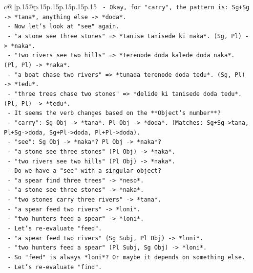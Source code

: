 \documentclass{article}
\begin{document}
{\begin{supertabular}{c@{$\;$}|p{.15\linewidth}@{}p{.15\linewidth}p{.15\linewidth}p{.15\linewidth}p{.15\linewidth}p{.15\linewidth}}
{{{\texttt{       {-} Okay, for "carry", the pattern is: Sg+Sg {-}> *tana*, anything else {-}> *doda*.} \\
\texttt{       {-} Now let's look at "see" again.} \\
\texttt{       {-} "a stone see three stones" => *tanise tanisede ki naka*. (Sg, Pl) {-}> *naka*.} \\
\texttt{       {-} "two rivers see two hills" => *terenode doda kalede doda naka*. (Pl, Pl) {-}> *naka*.} \\
\texttt{       {-} "a boat chase two rivers" => *tunada terenode doda tedu*. (Sg, Pl) {-}> *tedu*.} \\
\texttt{       {-} "three trees chase two stones" => *delide ki tanisede doda tedu*. (Pl, Pl) {-}> *tedu*.} \\
\texttt{       {-} It seems the verb changes based on the **Object's number**?} \\
\texttt{         {-} "carry": Sg Obj {-}> *tana*. Pl Obj {-}> *doda*. (Matches: Sg+Sg{-}>tana, Pl+Sg{-}>doda, Sg+Pl{-}>doda, Pl+Pl{-}>doda).} \\
\texttt{         {-} "see": Sg Obj {-}> *naka*? Pl Obj {-}> *naka*?} \\
\texttt{           {-} "a stone see three stones" (Pl Obj) {-}> *naka*.} \\
\texttt{           {-} "two rivers see two hills" (Pl Obj) {-}> *naka*.} \\
\texttt{           {-} Do we have a "see" with a singular object?} \\
\texttt{           {-} "a spear find three trees" {-}> *neso*.} \\
\texttt{           {-} "a stone see three stones" {-}> *naka*.} \\
\texttt{           {-} "two stones carry three rivers" {-}> *tana*.} \\
\texttt{           {-} "a spear feed two rivers" {-}> *loni*.} \\
\texttt{           {-} "two hunters feed a spear" {-}> *loni*.} \\
\texttt{       {-} Let's re{-}evaluate "feed".} \\
\texttt{         {-} "a spear feed two rivers" (Sg Subj, Pl Obj) {-}> *loni*.} \\
\texttt{         {-} "two hunters feed a spear" (Pl Subj, Sg Obj) {-}> *loni*.} \\
\texttt{         {-} So "feed" is always *loni*? Or maybe it depends on something else.} \\
\texttt{       {-} Let's re{-}evaluate "find".} \\
}}}
\end{supertabular}}
\end{document}

